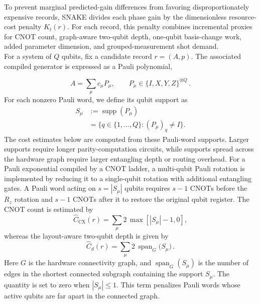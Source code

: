 \documentclass[
  reprint,
  amsmath,
  amssymb,
  aps,
  pra,
  nofootinbib,
  superscriptaddress,
  floatfix
]{revtex4-2}
\begin{document}
To prevent marginal predicted-gain differences from favoring disproportionately
expensive records, \textsc{SNAKE} divides each phase gain by the dimensionless
resource-cost penalty \(K_t(r)\). For each record, this penalty combines
incremental proxies for CNOT count, graph-aware two-qubit depth,
one-qubit basis-change work, added parameter dimension, and grouped-measurement
shot demand.\\
\noindent
For a system of \(Q\) qubits, fix a candidate record \(r=(A,p)\). The associated compiled generator is expressed as a Pauli polynomial,

\begin{equation}
A=\sum_{\mu}c_{\mu}P_{\mu}, \qquad P_{\mu}\in\{I,X,Y,Z\}^{\otimes Q}\,.
\label{eq:pauli_expansion}
\end{equation}
%
For each nonzero Pauli word, we define its qubit support as
%
\begin{equation}
\begin{aligned}
S_{\mu}
&:=\operatorname{supp}(P_{\mu}) \\
&=\{q\in\{1,\ldots,Q\}:(P_{\mu})_q\ne I\}.
\end{aligned}
\label{eq:pauli_word_support}
\end{equation}
%
The cost estimates below are computed from these Pauli-word supports. Larger supports require longer parity-computation circuits, while supports spread across the hardware graph require larger entangling depth or routing overhead. For a Pauli exponential compiled by a CNOT ladder, a multi-qubit Pauli rotation is implemented by reducing it to a single-qubit rotation with additional entangling gates. A Pauli word acting on \(s=|S_{\mu}|\) qubits requires \(s-1\) \textsc{CNOT}s before the \(R_z\) rotation and \(s-1\) \textsc{CNOT}s after it to restore the original qubit register. The CNOT count is estimated by
%
\begin{equation*}
\widehat C_{\mathrm{CX}}(r)=\sum_{\mu}2\,\max[|S_{\mu}|-1, 0],
\end{equation*}
whereas the layout-aware two-qubit depth is given by
\begin{equation*}
\widehat C_d(r)=\sum_{\mu}2\,\operatorname{span}_{G}
\bigl(S_{\mu}\bigr)\,.
\end{equation*}
Here \(G\) is the hardware connectivity graph, and $\operatorname{span}_{G}(S_{\mu})$ is the number of edges in the shortest connected subgraph containing the support \(S_{\mu}\). The quantity is set to zero when $|S_{\mu}|\le1$. This term penalizes Pauli words whose active qubits are far apart in the connected graph.\\
\end{document}
